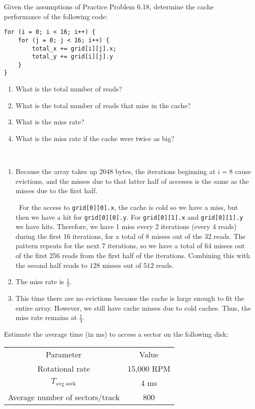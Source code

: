 \documentclass[12pt]{article}
\newenvironment{ex}[2][Exercise]{\begin{trivlist}
		\item[\hskip \labelsep {\bfseries #1}\hskip \labelsep {\bfseries #2.}]}{\end{trivlist}}
\newenvironment{sol}[1][Solution]{\begin{trivlist}
		\item[\hskip \labelsep {\bfseries #1:}]}{\end{trivlist}}
\begin{document}
\begin{ex}{6.20}
	Given the assumptions of Practice Problem 6.18, determine the cache performance of the
	following code:
	\begin{lstlisting}
for (i = 0; i < 16; i++) {
	for (j = 0; j < 16; i++) {
		total_x += grid[i][j].x;
		total_y += grid[i][j].y
	}
}
	\end{lstlisting}
	\begin{enumerate}[label=(\alph*)]
		\item What is the total number of reads?
		\item What is the total number of reads that miss in the cache?
		\item What is the miss rate?
		\item What is the miss rate if the cache were twice as big?
	\end{enumerate}
\end{ex}

\begin{sol}
	\
	\begin{enumerate}[label=(\alph*)]
		\item Because the array takes up $2048$ bytes, the iterations beginning at
		$i=8$ cause evictions, and the misses due to that latter half of accesses is
		the same as the misses due to the first half.
		
		\
		For the access to \texttt{grid[0][0].x}, the cache is cold so we have a miss,
		but then we have a hit for \texttt{grid[0][0].y}. For \texttt{grid[0][1].x}
		and \texttt{grid[0][1].y} we have hits. Therefore, we have 1 miss every 2
		iterations (every 4 reads) during the first 16 iterations, for a total of 8
		misses out of the 32 reads. The pattern repeats for the next 7 iterations,
		so we have a total of $64$ misses out of the first $256$ reads from the first
		half of the iterations. Combining this with the second half reads to $128$ misses
		out of $512$ reads.
		\item The miss rate is $\frac{1}{4}$.
		\item This time there are no evictions because the cache is large enough to fit
		the entire array. However, we still have cache misses due to cold caches. Thus,
		the miss rate remains at $\frac{1}{4}$.
	\end{enumerate}
\end{sol}

\begin{ex}{6.23}
	Estimate the average time (in ms) to access a sector on the following disk:
	\begin{center}
		\begin{tabular}{cc}
			Parameter & Value\\
			Rotational rate & 15,000 RPM\\
			$T_{\text{avg seek}}$ & 4 ms\\
			Average number of sectors/track & 800
		\end{tabular}
	\end{center}
\end{ex}
\end{document}
